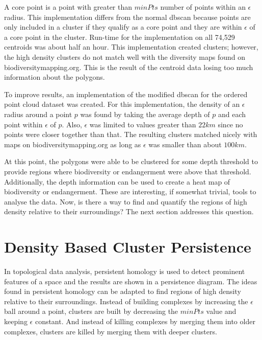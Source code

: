 \documentclass[11pt, fullpage,letterpaper]{article}
\begin{document}
		A core point is a point with greater than $minPts$ number of points within an $\epsilon$ radius. This implementation differs from the normal dbscan because points are only included in a cluster if they qualify as a core point and they are within $\epsilon$ of a core point in the cluster. Run-time for the implementation on all  74,529 centroids was about half an hour. This implementation created clusters; however, the high density clusters do not match well with the diversity maps found on biodiversitymapping.org. This is the result of the centroid data losing too much information about the polygons.
		
		To improve results, an implementation of the modified dbscan for the ordered point cloud dataset was created. For this implementation, the density of an $\epsilon$ radius around a point $p$ was found by taking the average depth of $p$ and each point within $\epsilon$ of $p$. Also, $\epsilon$ was limited to values greater than $22km$ since no points were closer together than that. The resulting clusters matched nicely with maps on biodiversitymapping.org as long as $\epsilon$ was smaller than about $100km$.
		
		At this point, the polygons were able to be clustered for some depth threshold to provide regions where biodiversity or endangerment were above that threshold. Additionally, the depth information can be used to create a heat map of biodiversity or endangerment. These are interesting, if somewhat trivial, tools to analyse the data. Now, is there a way to find and quantify the regions of high density relative to their surroundings? The next section addresses this question.
		
	\section{Density Based Cluster Persistence}
		In topological data analysis, persistent homology is used to detect prominent features of a space and the results are shown in a persistence diagram. The ideas found in persistent homology can be adapted to find regions of high density relative to their surroundings. Instead of building complexes by increasing the $\epsilon$ ball around a point, clusters are built by decreasing the $minPts$ value and keeping $\epsilon$ constant. And instead of killing complexes by merging them into older complexes, clusters are killed by merging them with deeper clusters.
		
\end{document}
